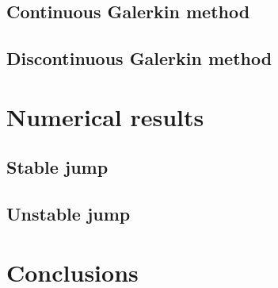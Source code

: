 \documentclass{article}
\begin{document}
\subsection{Continuous Galerkin method}

\subsection{Discontinuous Galerkin method}

\section{Numerical results}

\subsection{Stable jump}

\subsection{Unstable jump}

\section{Conclusions}




\end{document}
